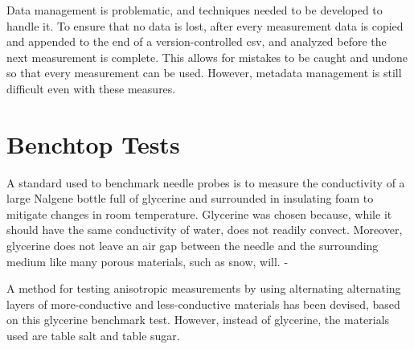 Data management is problematic, and techniques needed to be developed to handle
it. To ensure that no data is lost, after every measurement data is copied and
appended to the end of a version-controlled csv, and analyzed before the next
measurement is complete. This allows for mistakes to be caught and undone so
that every measurement can be used. However, metadata management is still
difficult even with these measures.

\section{Benchtop Tests}

A standard used to benchmark needle probes is to measure the conductivity of a
large Nalgene bottle full of glycerine and surrounded in insulating foam to
mitigate changes in room temperature. Glycerine was chosen because, while it
should have the same conductivity of water, does not readily convect. Moreover,
glycerine does not leave an air gap between the needle and the surrounding
medium like many porous materials, such as snow, will. -

A method for testing anisotropic measurements by using alternating alternating
layers of more-conductive and less-conductive materials has been devised, based on
this glycerine benchmark test. However, instead of glycerine, the materials
used are table salt and table sugar.

